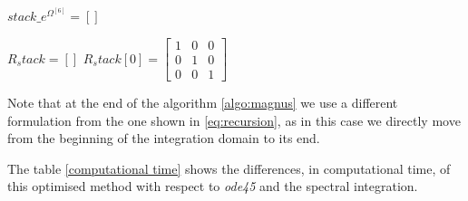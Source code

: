 \documentclass[12pt,a4paper]{article}
\begin{document}
\begin{algorithm}
\caption{The algorithm for the Magnus integrator}\label{algo:magnus}


$stack\_e^{\Omega^{[6]}} = []$\;\;



\For{$i \in \left[0, N_c - 1 \right)$}{
	$\textit{Get curvature from strain field at quadrature point}$\;
	$\begin{bmatrix}K_1 & K_2 & K_3 \end{bmatrix} \leftarrow \begin{bmatrix}\xi_1 & \xi_2 & \xi_3 \end{bmatrix}$\;\;

	$A_1 = \hat{K}_1$ \;
	$A_2 = \hat{K}_2$ \;
	$A_3 = \hat{K}_3$ \;\;
	
	
	$\alpha_1 = h_stack[i]*A_2$\;
   	$\alpha_2 = \frac{\sqrt{15}}{3}(A_3 - A_1)h\_stack[i]$\;
	$\alpha_3 = \frac{10}{3}(A_3 - 2A_2 + A_1)h\_stack[i]$\;\;
	
	
	$C_1 = \left[ \alpha_1, \; \alpha_2\right]$\;
	$C_1 = - \frac{1}{60}\left[ \alpha_1, \; 2\alpha_3 + C_1\right]$\;\;
	
	$\Omega^{[6]} = \alpha_1 + \frac{1}{12} \alpha_3 + \frac{1}{240}\left[-20\alpha_1 - \alpha_3 + C_1, \; \alpha_2 + C_2 \right]$\;\;
	
	
	$\textit{Stack the exponential into a vector}$\;
	$stack\_e^{\Omega^{[6]}}[i] = e^{\Omega^{[6]}}$
		
	
}\;

$R_stack = []$\;
$R_stack[0] = \begin{bmatrix}
1	&	0	&	0	\\
0	&	1	&	0	\\
0	&	0	&	1
\end{bmatrix}$ \;\;



\For{$i \in \left[0, N_c - 1 \right)$}{
	
	$R\_stack[i+1] = R\_stack[i] \cdot  stack\_e^{\Omega^{[6]}}[i]$\;
		
	
}\;


\end{algorithm}

Note that at the end of the algorithm \ref{algo:magnus} we use a different formulation from the one shown in \eqref{eq:recursion}, as in this case we directly move from the beginning of the integration domain to its end.


The table \ref{computational time} shows the differences, in computational time, of this optimised method with respect to \textit{ode45} and the spectral integration.
\end{document}
